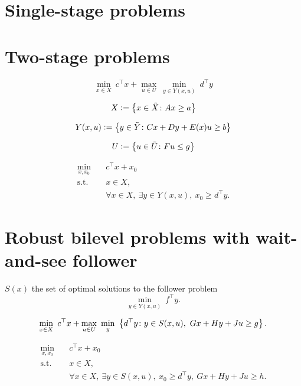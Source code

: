 \section{Single-stage problems}

\section{Two-stage problems}

\begin{equation*}
    \min_{x\in X} \ c^\top x + \max_{ u\in U } \ \min_{y\in Y(x,u)} \ d^\top y
\end{equation*}

\begin{equation*}
    X \mathrel{{\mathop:}{=}} \left\{ x\in \tilde{X} \colon Ax \ge a \right\}
\end{equation*}

\begin{equation*}
    Y(x,u) \mathrel{{\mathop:}{=}} \left\{ y\in \tilde{Y} \colon Cx + Dy + E(x)u \ge b \right\}
\end{equation*}

\begin{equation*}
    U \mathrel{{\mathop:}{=}} \left\{ u\in\tilde{U} \colon Fu \le g \right\}
\end{equation*}

\begin{subequations}
    \begin{align*}
        \min_{x,x_0} \quad & c^\top x + x_0 \\
        \text{s.t.} \quad & x\in X, \\
        & \forall x\in X, \ \exists y\in Y(x,u), \ x_0 \ge d^\top y.
    \end{align*}
\end{subequations}

\section{Robust bilevel problems with wait-and-see follower}

$S(x)$ the set of optimal solutions to the follower problem
\begin{equation*}
    \min_{y\in Y(x,u)} \ f^\top y.
\end{equation*}

\begin{equation*}
    \min_{x\in X} \ c^\top x + \max_{ u\in U } \ \min_{y} \ \left\{ d^\top y \colon y\in S(x,u), \ Gx + Hy + Ju \ge g \right\}.
\end{equation*}

\begin{subequations}
    \begin{align*}
        \min_{x,x_0} \quad & c^\top x + x_0 \\
        \text{s.t.} \quad & x\in X, \\
        & \forall x\in X, \ \exists y\in S(x,u), \ x_0 \ge d^\top y, \ Gx + Hy + Ju \ge h.
    \end{align*}
\end{subequations}
